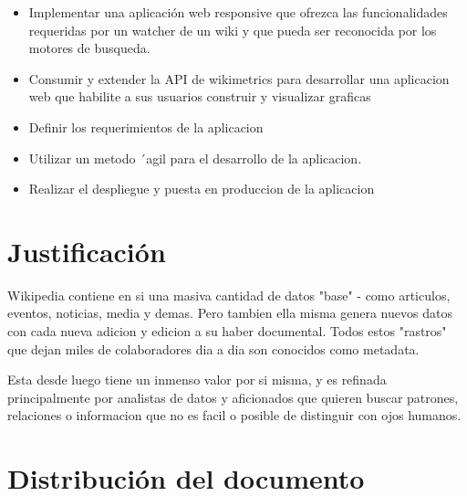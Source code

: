 \begin{itemize}{}{}

    \item Implementar una aplicación web responsive que ofrezca las funcionalidades requeridas por un watcher de un wiki y que pueda ser reconocida por los motores de busqueda.

    \item Consumir y extender la API de wikimetrics para desarrollar una aplicacion web que habilite a sus usuarios construir y visualizar graficas

    \item Definir los requerimientos de la aplicacion
    \item Utilizar un metodo ´agil para el desarrollo de la aplicacion.
    \item Realizar el despliegue y puesta en produccion de la aplicacion

\end{itemize}


\section{Justificación}

Wikipedia contiene en si una masiva cantidad de datos "base" - como articulos, eventos, noticias, media y demas. Pero tambien ella misma genera nuevos datos con cada nueva adicion y edicion a su haber documental. Todos estos "rastros" que dejan miles de colaboradores dia a dia son conocidos como metadata.

Esta desde luego tiene un inmenso valor por si misma, y es refinada principalmente por analistas de datos y aficionados que quieren buscar patrones, relaciones o informacion que no es facil o posible de distinguir con ojos humanos.





\section{Distribución del documento}

